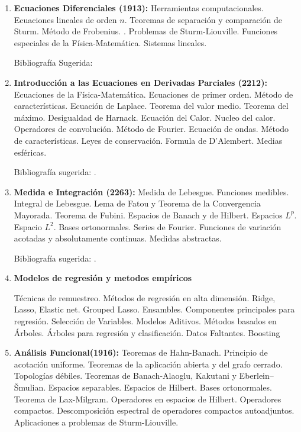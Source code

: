 \documentclass[a4paper, 12pt]{article}
\begin{document}
\begin{enumerate}
\item\textbf{Ecuaciones Diferenciales (1913):} Herramientas computacionales.  Ecuaciones lineales de orden $n$. Teoremas de separación y comparación de Sturm. Método de Frobenius. . Problemas de Sturm-Liouville. Funciones especiales de la Física-Matemática.  Sistemas lineales. 

Bibliografía Sugerida: \cite{ GeorgeFinlaySimmons487,WilliamE.Boyce496, MorrisW.Hirsch540,JorgeSotomayor513,BarbaraD.MacCluer515,RichardS.Palais519,GarrettBirkhoff526}


\item\textbf{Introducción a las Ecuaciones en Derivadas Parciales (2212):}  Ecuaciones de la Física-Matemática. Ecuaciones de primer orden. Método de características. Ecuación de Laplace. Teorema del valor medio. Teorema del máximo. Desigualdad de Harnack. Ecuación del Calor. Nucleo del calor. Operadores de convolución.  Método de Fourier.    Ecuación de ondas. Método de características. Leyes de conservación. Formula de D'{}Alembert. Medias esféricas. 

Bibliografía sugerida: \cite{LawrenceC.Evans271,WalterCraig494,AlexanderKomech496,JulianFernandezBonder511,DavidBorthwick689,FritzJohn692,SandroSalsa693,AndrasVasy695,YehudaPinchover697,PavelDrabek698, AslakTveito699}.



\item\textbf{Medida e Integración (2263):}  Medida de Lebesgue. Funciones medibles.
Integral de
Lebesgue. Lema de Fatou y Teorema de la Convergencia Mayorada.
Teorema de Fubini. Espacios de Banach y de Hilbert. Espacios
$L^p$. Espacio  $L^2$. Bases ortonormales. Series de Fourier.
Funciones de variación acotadas y absolutamente continuas. Medidas abstractas. 

Bibliografía sugerida: \cite{favazo, loeve, rudin, EliasM.Stein105,TerenceTao123,A.N.Kolmogorov682,DavidM.Bressoud121,wheeden2015measure}.



\item\textbf{Modelos de regresión y metodos empíricos}

 Técnicas de remuestreo. Métodos de regresión en alta dimensión. Ridge, Lasso, Elastic net. Grouped Lasso. Ensambles. Componentes principales para regresión. Selección de Variables. Modelos Aditivos. Métodos basados en Árboles. Árboles para regresión y clasificación. Datos Faltantes. Boosting

 
 \item\textbf{Análisis Funcional(1916):}  Teoremas de Hahn-Banach. Principio de acotación uniforme.  Teoremas de la aplicación abierta y del grafo cerrado. Topologías débiles. Teoremas de Banach-Alaoglu,  Kakutani y  Eberlein–Šmulian. Espacios separables. Espacios de Hilbert. Bases ortonormales. Teorema de Lax-Milgram. Operadores en espacios de Hilbert. Operadores compactos. Descomposición espectral de operadores compactos autoadjuntos. Aplicaciones a problemas de Sturm-Liouville.


\end{enumerate}
\end{document}
